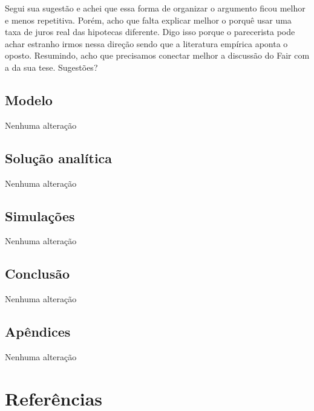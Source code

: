 \documentclass[11pt]{article}
\begin{document}
Segui sua sugestão e achei que essa forma de organizar o argumento ficou melhor e menos repetitiva. Porém, acho que falta explicar melhor o porquê usar uma taxa de juros real das hipotecas diferente. Digo isso porque o parecerista pode achar estranho irmos nessa direção sendo que a literatura empírica aponta o oposto. Resumindo, acho que precisamos conectar melhor a discussão do Fair com a da sua tese. Sugestões?



\subsection*{Modelo}
\label{sec:org068bbb3}

Nenhuma alteração

\subsection*{Solução analítica}
\label{sec:orged9a6d4}

Nenhuma alteração
\subsection*{Simulações}
\label{sec:org3d9944f}

Nenhuma alteração

\subsection*{Conclusão}
\label{sec:org75b66c4}

Nenhuma alteração

\subsection*{Apêndices}
\label{sec:orge6149de}

Nenhuma alteração

\section*{Referências}
\label{sec:org0ff9ec7}
\printbibliography[heading=none]
\end{document}
